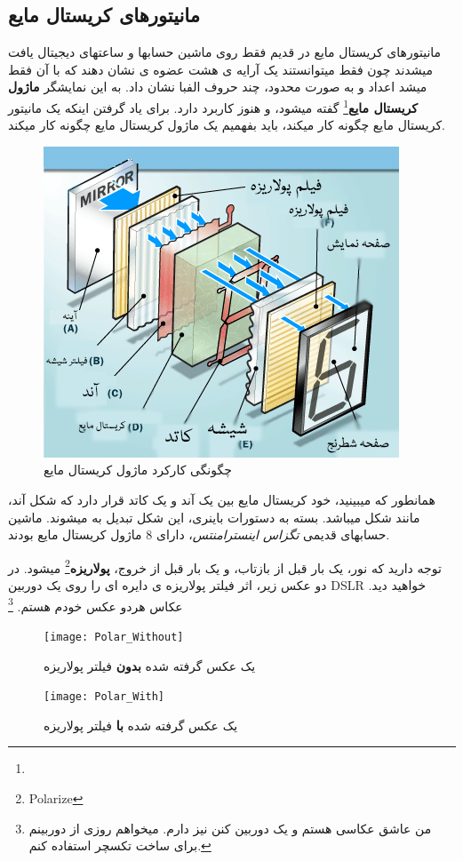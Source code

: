 \documentclass[14pt,a4paper]{memoir}
\begin{document}
	 \subsection{مانیتورهای کریستال مایع}\label{lcd}
	 
	 مانیتورهای کریستال مایع در قدیم فقط روی  ماشین حسابها و ساعتهای دیجیتال یافت میشدند چون فقط میتوانستند یک آرایه ی هشت عضوه ی نشان دهند که با آن فقط میشد اعداد و به صورت محدود، چند حروف الفبا نشان داد. به این نمایشگر \textbf{ماژول کریستال مایع}\footnote{} گفته میشود، و هنوز کاربرد دارد. برای یاد گرفتن اینکه یک مانیتور کریستال مایع چگونه کار میکند، باید بفهمیم یک ماژول کریستال مایع چگونه کار میکند.
	 
	 \begin{figure}[H]
	 	\centering
	 	\includegraphics[scale=0.7]{LCD}
	 	\caption{چگونگی کارکرد ماژول کریستال مایع}
	 \end{figure}
	 
	 همانطور که میبینید، خود کریستال مایع بین یک آند و یک کاتد قرار دارد که شکل آند، مانند شکل  میباشد. بسته به دستورات باینری، این شکل تبدیل به  میشوند. ماشین حسابهای قدیمی \textit{تگزاس اینسترامنتس}، دارای 8 ماژول کریستال مایع بودند. 
	
	
	توجه دارید که نور، یک بار قبل از بازتاب، و یک بار قبل از خروج، \textbf{پولاریزه}\footnote{Polarize} میشود. در دو عکس زیر، اثر فیلتر پولاریزه ی دایره ای را روی یک دوربین DSLR خواهید دید. عکاس هردو عکس خودم هستم. \footnote{من عاشق عکاسی هستم و یک دوربین  کنن نیز دارم. میخواهم روزی از دوربینم برای ساخت تکسچر استفاده کنم.}
	
	\begin{figure}[H]
		\centering
		\texttt{[image: Polar\_Without]}
		\caption{یک عکس گرفته شده \textbf{بدون} فیلتر پولاریزه}
		\texttt{[image: Polar\_With]}
		\caption{یک عکس گرفته شده \textbf{با} فیلتر پولاریزه }
	\end{figure}
\end{document}
